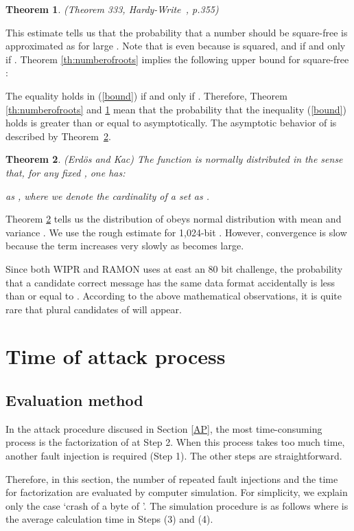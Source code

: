 \documentclass{article}
\newtheorem{thm}{Theorem}
\begin{document}
\begin{thm}(Theorem 333, Hardy-Write~\cite{Hardy-Wright}, p.355) \label{HWasym}

\end{thm}

This estimate tells us that the probability that a number should be square-free 
is approximated as  for large .
Note that  is even because  is squared, and  if and only if .
Theorem \ref{th:numberofroots} implies the following upper bound for square-free :

The equality holds in (\ref{bound}) if and only if . 
Therefore, Theorem \ref{th:numberofroots} and \ref{HWasym} mean that 
the probability that the inequality (\ref{bound}) holds 
is greater than or equal to  asymptotically.
The asymptotic behavior of  is described by Theorem~\ref{EK}.

\begin{thm}(Erd\"os and Kac\cite{ErdosKac}) \label{EK}
The function  is normally distributed in the 
sense that, for any fixed , one has:

as , 
where we denote the cardinality of a set  as .
\end{thm}

Theorem \ref{EK} tells us the distribution of  obeys 
normal distribution with mean  and variance .
We use the rough estimate  for 1,024-bit . 
However, convergence is slow because 
the term  increases very slowly as  becomes large.

Since both WIPR and RAMON uses at east an 80 bit challenge, 
the probability that a candidate correct message  has the same data format 
accidentally is less than or equal to .
According to the above mathematical observations, 
it is quite rare that plural candidates of  will appear.



\section{Time of attack process}\label{SIM}
\subsection{Evaluation method}
In the attack procedure discused in Section \ref{AP}, 
the most time-consuming process is the 
factorization of  at Step 2. 
When this process takes too much time, another fault injection 
is required (Step 1). The other steps are straightforward. 


 Therefore, in this section, the number of repeated fault injections and the time for factorization are 
evaluated by computer simulation. For simplicity, we explain only 
the case `crash of a byte of '. 
The simulation procedure is as follows where  is the average calculation time in Steps (3) and (4).
\end{document}
